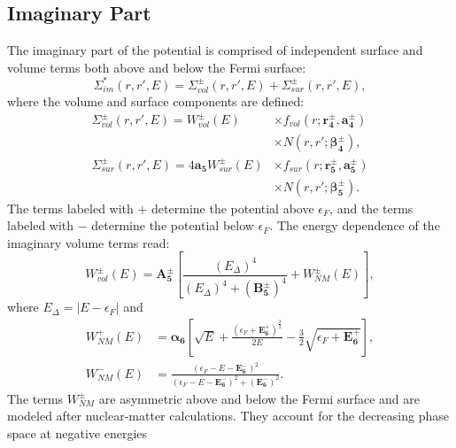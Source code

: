 \documentclass[twocolumn,secnumarabic,amssymb, nobibnotes, aps, prl,
superscriptaddress, nobalancelastpage, draft]{revtex4}
\begin{document}
\subsection{Imaginary Part}
The imaginary part of the potential is comprised of independent surface and volume terms
both above and below the Fermi surface:
\begin{equation}
    \Sigma_{im}^{*}(r,r',E) =
    \Sigma_{vol}^{\pm}(r,r',E)
    + \Sigma_{sur}^{\pm}(r,r',E),
\end{equation}
where the volume and surface components are defined:
\begin{equation}
    \begin{split}
        \Sigma_{vol}^{\pm}(r,r',E)
        = W_{vol}^{\pm}(E) & {\times}f_{vol}(r; \mathbf{r_{4}^{\pm}},
        \mathbf{a_{4}^{\pm}})\\
        & {\times}N(r,r'; \boldsymbol{\beta_{4}^{\pm}}),\\
        \Sigma_{sur}^{\pm}(r,r',E)
        = 4\mathbf{a_{5}}W_{sur}^{\pm}(E) & {\times}f_{sur}(r;
        \mathbf{r_{5}^{\pm}}, \mathbf{a_{5}^{\pm}})\\
        & {\times} N(r,r';\boldsymbol{\beta_{5}^{\pm}}).
    \end{split}
\end{equation}
The terms labeled with $+$ determine the potential above $\epsilon_{F}$, and the terms labeled
with $-$ determine the potential below $\epsilon_{F}$.
The energy dependence of the imaginary volume terms read:
\begin{equation} \label{ImagVolume}
    W_{vol}^{\pm}(E) = \mathbf{A_{5}^{\pm}}\left[\frac{(E_{\Delta})^{4}}
    {(E_{\Delta})^{4}+(\mathbf{B_{5}^{\pm}})^{4}} + W_{NM}^{\pm}(E)\right],
\end{equation}
where $E_{\Delta} = |E-\epsilon_{F}|$ and
\begin{equation}
    \begin{split}
        W_{NM}^{+}(E) & = {\boldsymbol{\alpha_{6}}}\left[\sqrt{E} +
            \frac{(\epsilon_{F}+\mathbf{E^{+}_{6}})^{\frac{3}{2}}}{2E}
        -\frac{3}{2}\sqrt{\epsilon_{F}+\mathbf{E^{+}_{6}}}\right],\\
        W_{NM}^{-}(E) & = \frac{(\epsilon_{F}-E-\mathbf{E_{6}^{-}})^{2}}
        {(\epsilon_{F}-E-\mathbf{E_{6}^{-}})^{2}+(\mathbf{E_{6}^{-}})^{2}}.
        \end{split}
    \end{equation}
The terms $W_{NM}^{\pm}$ are asymmetric above and below the Fermi surface and are modeled after
nuclear-matter calculations. They account for the decreasing phase space at negative energies
\end{document}
